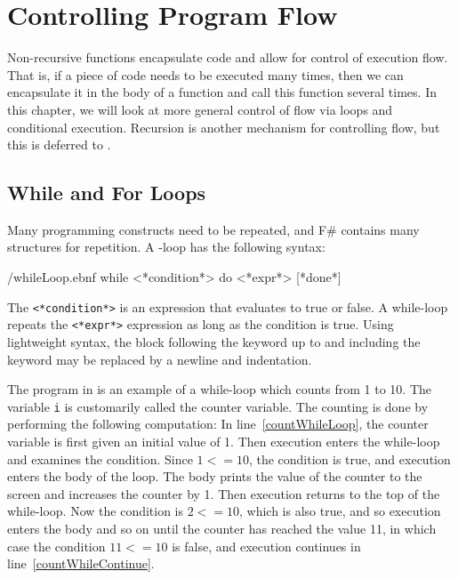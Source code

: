 \documentclass[fsharpnotes.tex]{subfiles}
\begin{document}
\chapter{Controlling Program Flow}
\label{chap:flow}
Non-recursive functions encapsulate code and allow for control of execution flow. That is, if a piece of code needs to be executed many times, then we can encapsulate it in the body of a function and call this function several times. In this chapter, we will look at more general control of flow via loops and conditional execution. Recursion is another mechanism for controlling flow, but this is deferred to .

\section{While and For Loops}
Many programming constructs need to be repeated, and F\# contains many structures for repetition. A -loop has the following syntax:
%
\begin{verbatimwrite}{\ebnf/whileLoop.ebnf}
while <*condition*> do <*expr*> [*done*]
\end{verbatimwrite}
%
The  \lstinline[language=syntax]{<*condition*>} is an expression that evaluates to true or false. A while-loop repeats the \lstinline[language=syntax]{<*expr*>} expression as long as the condition is true.  Using lightweight syntax, the block following the  keyword up to and including the  keyword may be replaced by a newline and indentation.

The program in  is an example of a while-loop which counts from 1 to 10.
%
%
The variable \lstinline{i} is customarily called the counter variable. The counting is done by performing the following computation: In line~\ref{countWhileLoop}, the counter variable is first given an initial value of 1. Then execution enters the while-loop and examines the condition. Since $1 <= 10$, the condition is true, and execution enters the body of the loop. The body prints the value of the counter to the screen and increases the counter by 1. Then execution returns to the top of the while-loop. Now the condition is $2 <= 10$, which is also true, and so execution enters the body and so on until the counter has reached the value 11, in which case the condition $11 <= 10$ is false, and execution continues in line~\ref{countWhileContinue}.
\end{document}
